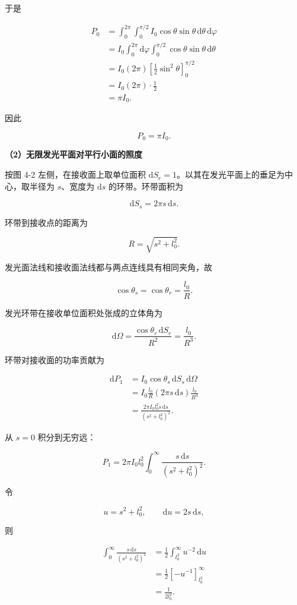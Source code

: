 \documentclass[12pt,a4paper,UTF8]{ctexart}
\begin{document}
于是

\[
\begin{aligned}
P_0
&=\int_0^{2\pi}\int_0^{\pi/2}
I_0\cos\theta\sin\theta\,\mathrm{d}\theta\,\mathrm{d}\varphi\\
&=I_0\int_0^{2\pi}\mathrm{d}\varphi
\int_0^{\pi/2}\cos\theta\sin\theta\,\mathrm{d}\theta\\
&=I_0(2\pi)
\left[\frac12\sin^2\theta\right]_0^{\pi/2}\\
&=I_0(2\pi)\cdot\frac12\\
&=\pi I_0.
\end{aligned}
\]

因此

\[\boxed{P_0=\pi I_0}.\]

\textbf{（2）无限发光平面对平行小面的照度}

按图 4-2 左侧，在接收面上取单位面积
\(\mathrm{d}S_r=1\)。以其在发光平面上的垂足为中心，取半径为
\(s\)、宽度为 \(\mathrm{d}s\) 的环带。环带面积为

\[\mathrm{d}S_s=2\pi s\,\mathrm{d}s.\]

环带到接收点的距离为

\[R=\sqrt{s^2+l_0^2}.\]

发光面法线和接收面法线都与两点连线具有相同夹角，故

\[
\cos\theta_s=\cos\theta_r=\frac{l_0}{R}.
\]

发光环带在接收单位面积处张成的立体角为

\[
\mathrm{d}\Omega=\frac{\cos\theta_r\,\mathrm{d}S_r}{R^2}
=\frac{l_0}{R^3}.
\]

环带对接收面的功率贡献为

\[
\begin{aligned}
\mathrm{d}P_1
&=I_0\cos\theta_s\,\mathrm{d}S_s\,\mathrm{d}\Omega\\
&=I_0\frac{l_0}{R}(2\pi s\,\mathrm{d}s)
\frac{l_0}{R^3}\\
&=\frac{2\pi I_0l_0^2s\,\mathrm{d}s}
{(s^2+l_0^2)^2}.
\end{aligned}
\]

从 \(s=0\) 积分到无穷远：

\[
P_1=2\pi I_0l_0^2
\int_0^\infty\frac{s\,\mathrm{d}s}{(s^2+l_0^2)^2}.
\]

令

\[u=s^2+l_0^2,
\qquad \mathrm{d}u=2s\,\mathrm{d}s,\]

则

\[
\begin{aligned}
\int_0^\infty\frac{s\,\mathrm{d}s}{(s^2+l_0^2)^2}
&=\frac12\int_{l_0^2}^{\infty}u^{-2}\,\mathrm{d}u\\
&=\frac12\left[-u^{-1}\right]_{l_0^2}^{\infty}\\
&=\frac1{2l_0^2}.
\end{aligned}
\]
\end{document}
